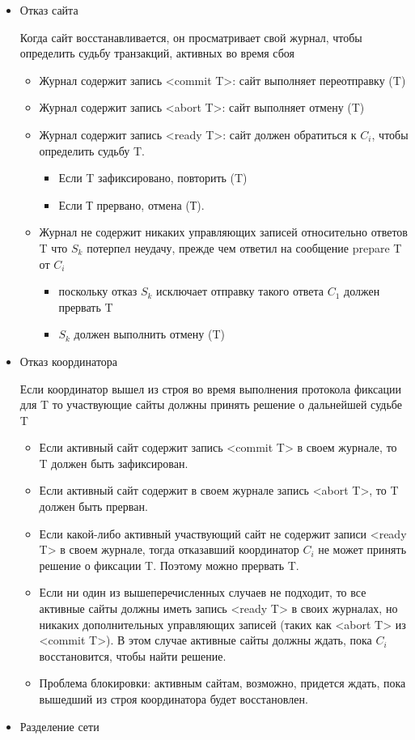\begin{itemize}
\item Отказ сайта

Когда сайт восстанавливается, он просматривает свой журнал, чтобы определить судьбу транзакций, активных во время сбоя %
\begin{itemize}
\item Журнал содержит запись <commit T>: сайт выполняет переотправку (T)
\item Журнал содержит запись <abort T>: сайт выполняет отмену (T)
\item Журнал содержит запись <ready T>: сайт должен обратиться к $C_i$, чтобы определить судьбу T.
\begin{itemize}
\item Если T зафиксировано, повторить (T)
\item Если Т прервано, отмена (Т).
\end{itemize}
\item Журнал не содержит никаких управляющих записей относительно ответов T что $S_k$ потерпел неудачу, прежде чем ответил на сообщение prepare T от $C_i$
\begin{itemize}
\item поскольку отказ $S_k$ исключает отправку такого ответа $C_1$ должен прервать T
\item $S_k$ должен выполнить отмену (T)
\end{itemize}
\end{itemize}  

\item Отказ координатора

Если координатор вышел из строя во время выполнения протокола фиксации для T то участвующие сайты должны принять решение о дальнейшей судьбе T %
\begin{itemize}
\item Если активный сайт содержит запись <commit T> в своем журнале, то T должен быть зафиксирован.
\item Если активный сайт содержит в своем журнале запись <abort T>, то T должен быть прерван.
\item Если какой-либо активный участвующий сайт не содержит записи <ready T> в своем журнале, тогда отказавший координатор $C_i$ не может принять решение о фиксации T. Поэтому можно прервать T.
\item Если ни один из вышеперечисленных случаев не подходит, то все активные сайты должны иметь запись <ready T> в своих журналах, но никаких дополнительных управляющих записей (таких как <abort T> из <commit T>). В этом случае активные сайты должны ждать, пока $C_i$ восстановится, чтобы найти решение.
\item Проблема блокировки: активным сайтам, возможно, придется ждать, пока вышедший из строя координатора будет восстановлен.
\end{itemize}
\item Разделение сети


\end{itemize}
